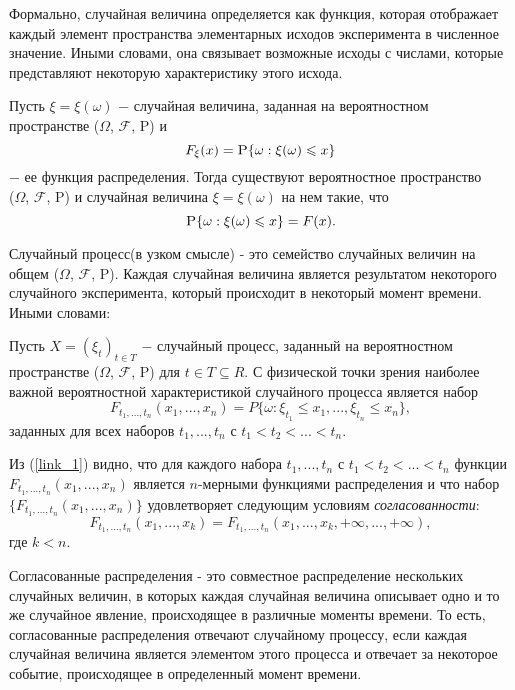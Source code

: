 Формально, случайная величина определяется как функция, которая отображает каждый элемент пространства элементарных исходов эксперимента в численное значение. Иными словами, она связывает возможные исходы с числами, которые представляют некоторую характеристику этого исхода.

Пусть $\xi = \xi(\omega)$ $-$ случайная величина, заданная на вероятностном пространстве ($\Omega$, $\mathscr{F}$, P) и 
$$F_\xi(x) = \textsc{P}\{ \omega: \xi(\omega) \leq x\} $$
$-$ ее функция распределения. Тогда существуют вероятностное пространство \\
($\Omega$, $\mathscr{F}$, P) и случайная величина $\xi = \xi(\omega)$ на нем такие, что
$$\textsc{P}\{ \omega: \xi(\omega) \leq x\} = F(x).$$

Случайный процесс(в узком смысле) - это семейство случайных величин на общем ($\Omega$, $\mathscr{F}$, P). Каждая случайная величина является результатом некоторого случайного эксперимента, который происходит в некоторый момент времени. Иными словами:

Пусть $X=(\xi_t)_{t \in T}$ $-$ случайный процесс, заданный на вероятностном пространстве ($\Omega$, $\mathscr{F}$, P) для $t \in T \subseteq R$. С физической точки зрения наиболее важной вероятностной характеристикой случайного процесса является набор 
\begin{equation} \label{link_1}
F_{t_1, ... , t_n}(x_1, ... , x_n) = P\{\omega: \xi_{t_1} \leq x_1, ... ,\xi_{t_n} \leq x_n\}, 
\end{equation}
заданных для всех наборов $t_1, ... , t_n$ с $t_1 < t_2 < ... < t_n$.

Из (\ref{link_1}) видно, что для каждого набора $t_1, ..., t_n$ с $t_1 < t_2 < ... < t_n$ функции  $F_{t_1, ... , t_n}(x_1, ... , x_n)$ является $n$-мерными функциями распределения и что набор \\ $\{F_{t_1, ... , t_n}(x_1, ... , x_n)\}$ удовлетворяет следующим условиям \emph{согласованности}:
\begin{equation} \label{link_2}
F_{t_1, ... , t_n}(x_1, ... , x_k) = F_{t_1, ... , t_n}(x_1, ... , x_k, +\infty, ... , +\infty), 
\end{equation}
где $k < n$.

Согласованные распределения - это совместное распределение нескольких случайных величин, в которых каждая случайная величина описывает одно и то же случайное явление, происходящее в различные моменты времени. То есть, согласованные распределения отвечают случайному процессу, если каждая случайная величина является элементом этого процесса и отвечает за некоторое событие, происходящее в определенный момент времени. 

